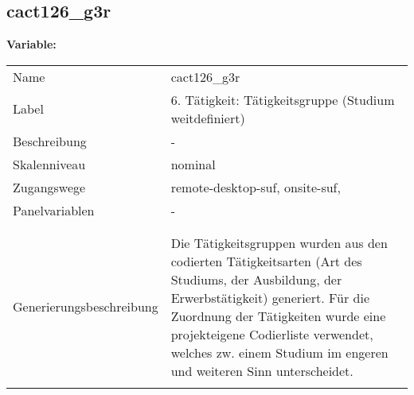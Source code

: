 	
	
	\subsection{cact126\_g3r}
	\label{subSection:cact126_g3r}

	\noindent\textbf{Variable:}\\
		\begin{tabular}{lL{11.3cm}}
			\label{tableVariable:cact126_g3r}
			Name & cact126\_g3r \\
			Label & 6. Tätigkeit: Tätigkeitsgruppe (Studium weitdefiniert) \\
			Beschreibung & - \\
			Skalenniveau & nominal \\
			Zugangswege &
				remote-desktop-suf,
				onsite-suf,
 \\
			Panelvariablen & -
			 \\
			 \\
 \\
					Generierungsbeschreibung & Die Tätigkeitsgruppen wurden aus den codierten Tätigkeitsarten (Art des Studiums, der Ausbildung, der Erwerbstätigkeit) generiert. Für die Zuordnung der Tätigkeiten wurde eine projekteigene Codierliste verwendet, welches zw. einem Studium im engeren und weiteren Sinn unterscheidet.
				 \\	
			 \\
		\end{tabular}






